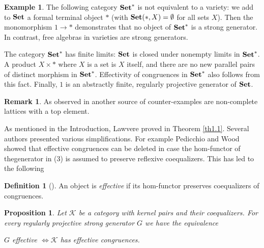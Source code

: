 \documentclass[12pt,amstex,leqno]{amsart}
\newcommand\Set{\operatorname{\bf Set}}
\newcommand\ck{\mathcal {K}}
\newtheorem{prop}[theorem]{Proposition}
\theoremstyle{definition}
\newtheorem{defi}[theorem]{Definition}
\newtheorem{example}[theorem]{Example}
\newtheorem{remark}[theorem]{Remark}
\numberwithin{equation}{section}
\begin{document}
\begin{example}\label{E:cont}
The following category $\Set^\ast$ is not equivalent to a variety: we add to $\Set$ a formal terminal object $\ast$ (with $\Set (\ast, X) =\emptyset$ for all sets $X$). Then the monomorphism  $1\to \ast$ demonstrates that no object of $\Set^\ast$ is a strong generator. In contrast, free algebras in varieties are strong generators.

The category $\Set^\ast$ has finite limits: $\Set$ is closed under  nonempty limits in $\Set^\ast$. A product $X\times  \ast$ where $X$ is a set is $X$ itself, and there are no  new parallel pairs of distinct morphism in $\Set^\ast$.
Effectivity of congruences in $\Set^\ast$ 
 also follows from this fact. Finally, $1$ is an abstractly finite, regularly projective generator of $\Set$.
 \end{example}


\begin{remark}
As observed in \cite{A} another source of counter-examples are non-complete lattices with a top element.
\end{remark}

As mentioned in the Introduction, Lawvere proved in \cite{L} Theorem \ref{th1.1}. Several authors presented various simplifications. For example Pedicchio and Wood \cite{PW} showed that effective congruences can be deleted in case the hom-functor of thegenerator in (3) is assumed to  preserve reflexive coequalizers. This has led to the following

\begin{defi}[\cite{ARV}]
An object is \emph{effective} if its hom-functor preserves coequalizers of congruences.
\end{defi}

\begin{prop}\label{P:eff}
Let $\ck$ be a category with kernel pairs and their coequalizers. For every regularly projective strong generator $G$ we have the equivalence
\begin{center}
$G$ effective $\Leftrightarrow  \ck$ has effective congruences.
\end{center}
\end{prop}
\end{document}

